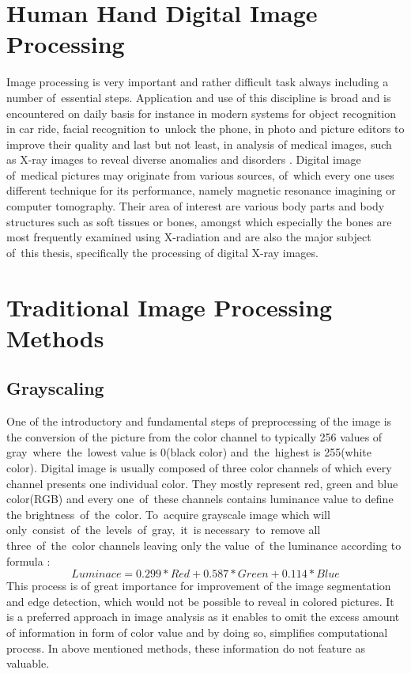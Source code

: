 \section{Human Hand Digital Image Processing}
Image processing is very important and rather difficult task always including a number of~essential steps. Application and use of this discipline is broad and is encountered on daily basis for instance in modern systems for object recognition in car ride, facial recognition to~unlock the phone, in photo and picture editors to improve their quality and last but not least, in analysis of medical images, such as X-ray images to reveal diverse anomalies and disorders \cite{image-processing-intro, image-processing-intro2}. Digital image of~medical pictures may originate from various sources, of~which every one uses different technique for its performance, namely magnetic resonance imagining or computer tomography. Their area of interest are various body parts and body structures such as soft tissues or bones, amongst which especially the bones are most frequently examined using X-radiation and are also the major subject of~this thesis, specifically the processing of digital X-ray images.

\section{Traditional Image Processing Methods}

\subsection{Grayscaling}
One of the introductory and fundamental steps of preprocessing of the image is the conversion of the picture from the color channel to typically \textsc{256} values of gray~where~the~lowest value is \textsc{0}(black color) and~the~highest is \textsc{255}(white color). Digital image is usually composed of three color channels of which every channel presents one individual color. They mostly represent red, green and blue color(RGB) and every one~of~these channels contains luminance value to define the brightness~of~the~color. To~acquire grayscale image which will only~consist~of~the~levels~of~gray,~it~is necessary~to~remove all three~of~the~color channels leaving only the value~of~the luminance according to formula \cite{grayscale, grayscale-formula}:
\begin{equation}
Luminace = 0.299 * Red + 0.587 * Green + 0.114 * Blue 
\end{equation}
This process is of great importance for improvement of the image segmentation and edge detection, which would not be possible to reveal in colored pictures. It is a preferred approach in image analysis as it enables to omit the excess amount of information in form of color value and by doing so, simplifies computational process. In above mentioned methods, these information do not feature as valuable. 

